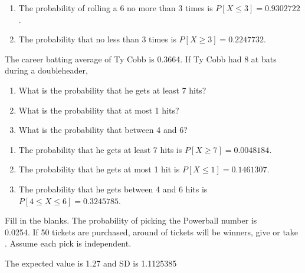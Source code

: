 \documentclass[11pt, chapterprefix=true]{scrbook}\usepackage[]{graphicx}\usepackage[]{color}
\begin{document}
\begin{exercises}
\begin{solution}
\begin{enumerate}
\item The probability of rolling a 6 no more than 3 times is $P[X \le 3] = 0.9302722$.
\item The probability that no less than 3 times is $P[X \ge 3] = 0.2247732$.
\end{enumerate}
  \end{solution}

  \begin{exercise} %

The career batting average of Ty Cobb is 0.3664. If Ty Cobb had 8 at bats during a doubleheader,

\begin{enumerate}
\item What is the probability that he gets at least 7 hits?
\item What is the probability that at most 1 hits?
\item What is the probability that between 4 and 6?
\end{enumerate}
	\end{exercise}
	\begin{solution}  %


\begin{enumerate}
\item The probability that he gets at least 7 hits is $P[X \ge 7] = 0.0048184$.
\item The probability that he gets at most 1 hit is $P[X \le 1] = 0.1461307$.
\item The probability that he gets between 4 and 6 hits is $P[4 \le X \le 6] = 0.3245785$.
\end{enumerate}

  \end{solution}

	\begin{exercise}  %

Fill in the blanks. The probability of picking the Powerball number is \\ 0.0254. If 50 tickets are purchased, around \underline{\phantom{xxxxxxxx}} of  tickets will be winners,  give or take  \underline{\phantom{xxxxxxxx}}.    Assume each pick is independent.
	\end{exercise}
	\begin{solution}  %


The expected value is 1.27 and SD is 1.1125385

	\end{solution}


\end{exercises}
\end{document}
